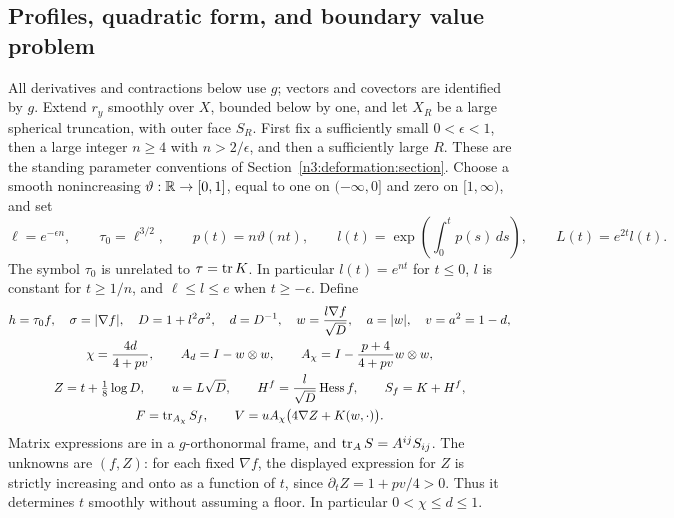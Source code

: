\subsection{Profiles, quadratic form, and boundary value problem}

All derivatives and contractions below use $g$; vectors and covectors
are identified by $g$.  Extend $r_y$ smoothly over $X$, bounded below
by one, and let $X_R$ be a large spherical truncation, with outer face
$S_R$.  First fix a sufficiently small $0<\epsilon<1$, then a large
integer $n\ge4$ with $n>2/\epsilon$, and then a sufficiently large
$R$.  These are the standing parameter conventions of
Section~\ref{n3:deformation:section}.  Choose a smooth nonincreasing
$\vartheta:\mathbb R\to[0,1]$, equal to one on $(-\infty,0]$ and zero
on $[1,\infty)$, and set
\begin{equation}\label{ch:ell:profiles}
 \ell=e^{-\epsilon n},\qquad \tau_0=\ell^{3/2},\qquad
 p(t)=n\vartheta(nt),\qquad
 l(t)=\exp\!\left(\int_0^t p(s)\,ds\right),\qquad
 L(t)=e^{2t}l(t).
\end{equation}
The symbol $\tau_0$ is unrelated to $\tau=\operatorname{tr} K$.
In particular $l(t)=e^{nt}$ for $t\le0$, $l$ is constant for
$t\ge1/n$, and $\ell\le l\le e$ when $t\ge-\epsilon$.
Define
\begin{equation}\label{ch:ell:variables}
 \begin{gathered}
 h=\tau_0f,\quad \sigma=|\nabla f|,\quad
 D=1+l^2\sigma^2,\quad d=D^{-1},\quad
 w=\frac{l\nabla f}{\sqrt D},\quad a=|w|,\quad v=a^2=1-d,\\
 \chi=\frac{4d}{4+pv},\qquad
 A_d=I-w\otimes w,\qquad
 A_\chi=I-\frac{p+4}{4+pv}w\otimes w,\\
 Z=t+\tfrac18\log D,\qquad u=L\sqrt D,\qquad
 H^f=\frac l{\sqrt D}\operatorname{Hess} f,\qquad S_f=K+H^f,\\
 F=\operatorname{tr}_{A_\chi}S_f,\qquad
 V=uA_\chi\bigl(4\nabla Z+K(w,\cdot)\bigr).
 \end{gathered}
\end{equation}
Matrix expressions are in a $g$-orthonormal frame, and
$\operatorname{tr}_A S=A^{ij}S_{ij}$.  The unknowns are $(f,Z)$:
for each fixed $\nabla f$, the displayed expression for $Z$ is
strictly increasing and onto as a function of $t$, since
$\partial_tZ=1+pv/4>0$.  Thus it determines $t$ smoothly without
assuming a floor.  In particular $0<\chi\le d\le1$.

